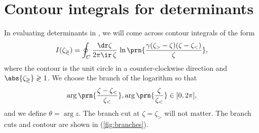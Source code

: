 \documentclass[12pt]{article}
\begin{document}
\section{Contour integrals for determinants}\label{sec:contourints}

In evaluating determinants in , we will come across contour integrals of the form
%
\begin{equation}\label{eq:contourint}
  I(\zeta_\gtrless) = \oint_C \frac{\dr\zeta}{2\pi\ir\,\zeta} \, \ln\prn{\frac{\gamma(\zeta_>-\zeta)(\zeta-\zeta_<)}{\zeta}},
\end{equation}
%
where the contour is the unit circle in a counter-clockwise direction and $\abs{\zeta_\gtrless}\gtrless1$.
We choose the branch of the logarithm so that
%
\begin{equation}\label{eq:branch}
  \arg\prn{\frac{\zeta-\zeta_<}{\zeta_<}},\arg\prn{\frac{\zeta}{\zeta_<}} \in [0,2\pi],
\end{equation}
%
and we define $\theta=\arg z$.
The branch cut at $\zeta=\zeta_>$ will not matter.
The branch cuts and contour are shown in (\ref{fig:branches}).
\end{document}
